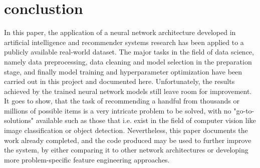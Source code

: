 \documentclass[10pt,final,journal,a4paper,oneside,twocolumn]{IEEEtran}
\begin{document}

\section{conclustion}
In this paper, the application of a neural network architecture developed in artificial intelligence and recommender systems research has been applied to a publicly available real-world dataset.
The major tasks in the field of data science, namely data preprocessing, data cleaning and model selection in the preparation stage, and finally model training and hyperparameter optimization have been carried out in this project and documented here.
Unfortunately, the results achieved by the trained neural network models still leave room for improvement. It goes to show, that the task of recommending a handful from thousands or millions of possible items is a very intricate problem to be solved, with no "go-to-solutions" available such as those that i.e. exist in the field of computer vision like image classification or object detection. 
Nevertheless, this paper documents the work already completed, and the code produced may be used to further improve the system, by either comparing it to other network architectures or developing more problem-specific feature engineering approaches.

\end{document}

